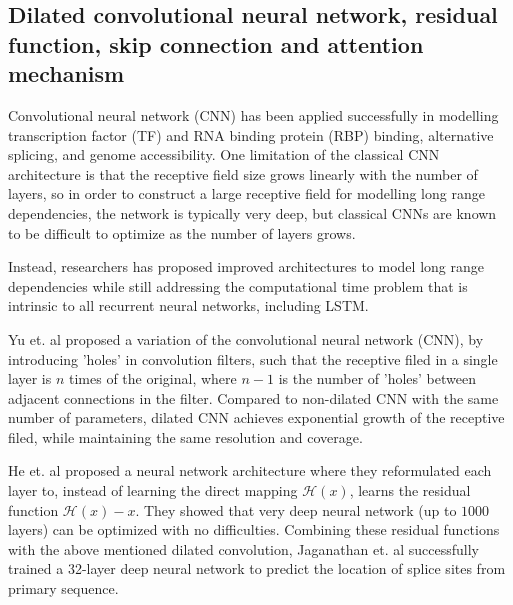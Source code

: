 \documentclass{proposal}
\begin{document}
\subsection*{Dilated convolutional neural network, residual function, skip connection and attention mechanism}


Convolutional neural network (CNN) has been applied successfully in
modelling transcription factor (TF) and RNA binding protein (RBP) binding\cite{alipanahi2015predicting, gandhi2018cdeepbind},
alternative splicing\cite{bretschneider2018cossmo}, and genome accessibility\cite{kelley2016basset}.
One limitation of the classical CNN architecture is that the receptive field size grows linearly with the number of
layers, so in order to construct a large receptive field for modelling long range dependencies,
the network is typically very deep, but classical CNNs are known to be difficult to optimize as the number of layers grows.

Instead, researchers has proposed improved architectures to model long range dependencies
while still addressing the computational time problem that is intrinsic to all recurrent neural networks, including LSTM.

Yu et. al\cite{yu2015multi} proposed a variation of the convolutional neural network (CNN),
by introducing 'holes' in convolution filters, such that the receptive filed in a single layer is $n$ times of the original,
where $n-1$ is the number of 'holes' between adjacent connections in the filter.
Compared to non-dilated CNN with the same number of parameters,
dilated CNN achieves exponential growth of the receptive filed,
while maintaining the same resolution and coverage.


He et. al\cite{he2016deep} proposed a neural network architecture where they reformulated
each layer to, instead of learning the direct mapping $\mathcal{H}(x)$,
learns the residual function $\mathcal{H}(x) - x$.
They showed that very deep neural network (up to $1000$ layers) can be optimized with no difficulties.
Combining these residual functions with the above mentioned dilated convolution,
Jaganathan et. al\cite{jaganathan2019predicting} successfully trained a 32-layer deep neural network to predict
the location of splice sites from primary sequence.
\end{document}
